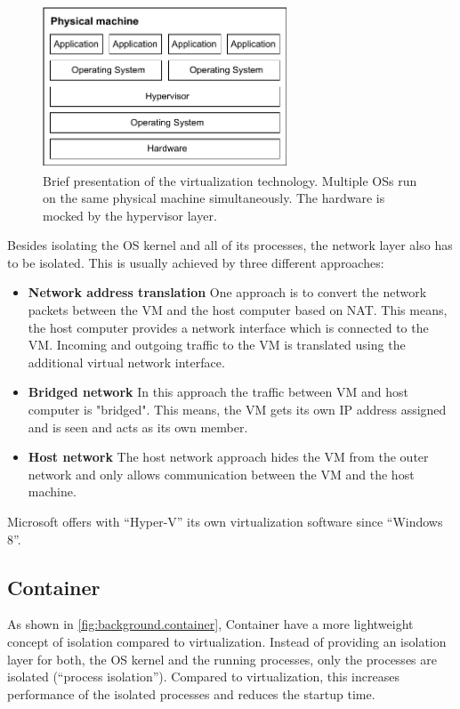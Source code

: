 \begin{figure}[b]
	\centering
	\includegraphics[width=0.65\textwidth]{Figures/virtualization.pdf}
	\caption{Brief presentation of the virtualization technology\cite{RamosApolinario.2021, Warrier.20201120}. Multiple \acp{OS} run on the same physical machine simultaneously. The hardware is mocked by the hypervisor layer.}
	\label{fig:background.virtualization}
\end{figure}

Besides isolating the \ac{OS} kernel and all of its processes, the network layer also has to be isolated. This is usually achieved by three  different approaches:
\begin{itemize}
\item \textbf{Network address translation} One approach is to convert the network packets between the \ac{VM} and the host computer based on \ac{NAT}. This means, the host computer provides a network interface which is connected to the \ac{VM}. Incoming and outgoing traffic to the \ac{VM} is translated using the additional virtual network interface. %
\item \textbf{Bridged network} In this approach the traffic between \ac{VM} and host computer is "bridged". This means, the \ac{VM} gets its own \ac{IP} address assigned and is seen and acts as its own member.
\item \textbf{Host network} The host network approach hides the \ac{VM} from the outer network and only allows communication between the \ac{VM} and the host machine.
\end{itemize}


Microsoft offers with \enquote{Hyper-V} its own virtualization software since \enquote{Windows 8}. %


\subsection{Container}
As shown in \autoref{fig:background.container}, Container have a more lightweight concept of isolation compared to virtualization. Instead of providing an isolation layer for both, the \ac{OS} kernel and the running processes, only the processes are isolated (\enquote{process isolation}). Compared to virtualization, this increases performance of the isolated processes and reduces the startup time.

